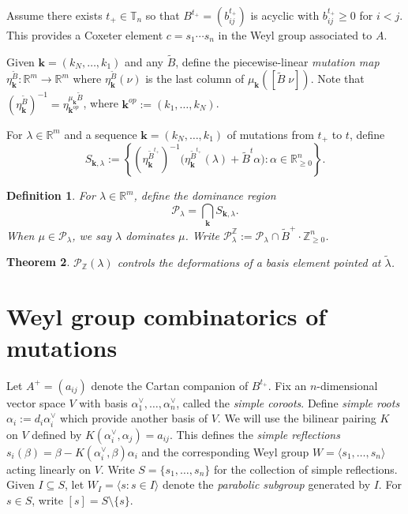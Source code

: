 \documentclass{amsart}
\newtheorem{theorem}{Theorem}
\newtheorem{definition}[theorem]{Definition}
\numberwithin{theorem}{section}
\newcommand{\bfk}{{\boldsymbol{k}}}
\newcommand{\cP}{\mathcal{P}}
\newcommand{\RR}{\mathbb{R}}
\newcommand{\TT}{\mathbb{T}}
\newcommand{\ZZ}{\mathbb{Z}}
\begin{document}
  Assume there exists $t_+\in\TT_n$ so that $B^{t_+}=(b^{t_+}_{ij})$ is acyclic with $b^{t_+}_{ij}\ge 0$ for $i<j$.
  This provides a Coxeter element $c=s_1\cdots s_n$ in the Weyl group associated to $A$.
  
  Given $\bfk=(k_N,\ldots,k_1)$ and any $\widetilde B$, define the piecewise-linear \emph{mutation map} $\eta^{\widetilde B}_\bfk:\RR^m\to\RR^m$ where $\eta^{\widetilde B}_\bfk(\nu)$ is the last column of $\mu_\bfk([\widetilde{B}\;\nu])$.
  Note that $\left(\eta^{\widetilde{B}}_\bfk\right)^{-1}=\eta^{\mu_\bfk\widetilde{B}}_{\bfk^{op}}$, where $\bfk^{op}:=(k_1,\ldots,k_N)$.

  For $\lambda\in\RR^m$ and a sequence $\bfk=(k_N,\ldots,k_1)$ of mutations from $t_+$ to $t$, define 
  \[S_{\bfk,\lambda}:=\left\{\left(\eta^{\widetilde B^{t_+}}_\bfk\right)^{-1}\big(\eta^{\widetilde B^{t_+}}_\bfk(\lambda)+\widetilde B^t\alpha\big):\alpha\in\RR^n_{\ge0}\right\}.\]
  
  \begin{definition}
    For $\lambda\in\RR^m$, define the \emph{dominance region} 
    \[
      \cP_\lambda = \bigcap_\bfk S_{\bfk,\lambda}.
    \]
    When $\mu\in\cP_\lambda$, we say \emph{$\lambda$ dominates $\mu$}.
    Write $\cP_\lambda^\ZZ:=\cP_\lambda\cap \widetilde B^+ \cdot \ZZ_{\ge0}^n$. 
  \end{definition}

  \begin{theorem}
    \cite{qin}
    $\cP_\ZZ(\lambda)$ controls the deformations of a basis element pointed at $\widetilde\lambda$.
  \end{theorem}


  \section{Weyl group combinatorics of mutations}
  Let $A^+=(a_{ij})$ denote the Cartan companion of $B^{t_+}$.
  Fix an $n$-dimensional vector space $V$ with basis $\alpha^\vee_1,\ldots,\alpha^\vee_n$, called the \emph{simple coroots}.
  Define \emph{simple roots} $\alpha_i:=d_i\alpha^\vee_i$ which provide another basis of $V$.
  We will use the bilinear pairing $K$ on $V$ defined by $K(\alpha^\vee_i,\alpha_j)=a_{ij}$.
  This defines the \emph{simple reflections} $s_i(\beta)=\beta-K(\alpha^\vee_i,\beta)\alpha_i$ and the corresponding Weyl group $W=\langle s_1,\ldots,s_n\rangle$ acting linearly on $V$.
  Write $S=\{s_1,\ldots,s_n\}$ for the collection of simple reflections.
  Given $I\subseteq S$, let $W_I=\langle s:s\in I\rangle$ denote the \emph{parabolic subgroup} generated by $I$.
  For $s\in S$, write $[s]=S\setminus\{s\}$.
\end{document}
